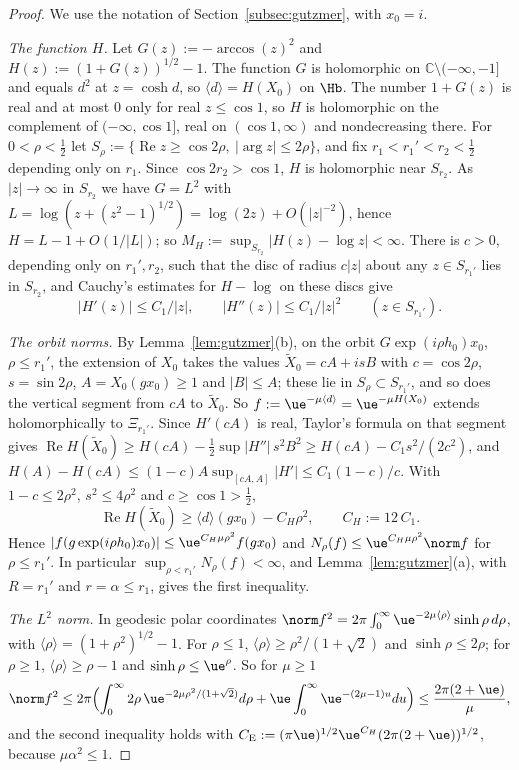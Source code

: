 \begin{proof}
We use the notation of Section~\ref{subsec:gutzmer}, with $x_0=i$.

\emph{The function $H$.} Let $G(z):=-\arccos(z)^2$ and $H(z):=(1+G(z))^{1/2}-1$. The function $G$ is holomorphic on
$\mathbb C\setminus(-\infty,-1]$ and equals $d^2$ at $z=\cosh d$, so $\langle d\rangle=H(X_0)$ on $\Hb$. The number $1+G(z)$ is real and at most $0$ only for
real $z\le\cos1$, so $H$ is holomorphic on the complement of $(-\infty,\cos1]$, real on $(\cos1,\infty)$ and nondecreasing there.
For $0<\rho<\tfrac12$ let $S_\rho:=\{\operatorname{Re}z\ge\cos2\rho,\ |\arg z|\le2\rho\}$, and fix $r_1<r_1'<r_2<\tfrac12$ depending only on $r_1$.
Since $\cos2r_2>\cos1$, $H$ is holomorphic near $S_{r_2}$. As $|z|\to\infty$ in $S_{r_2}$ we have $G=L^2$ with
$L=\log(z+(z^2-1)^{1/2})=\log(2z)+O(|z|^{-2})$, hence $H=L-1+O(1/|L|)$; so $M_H:=\sup_{S_{r_2}}|H(z)-\log z|<\infty$. There is $c>0$,
depending only on $r_1',r_2$, such that the disc of radius $c|z|$ about any $z\in S_{r_1'}$ lies in $S_{r_2}$, and Cauchy's estimates for
$H-\log$ on these discs give
\[
|H'(z)|\le C_1/|z|,\qquad|H''(z)|\le C_1/|z|^2\qquad(z\in S_{r_1'}).
\]

\emph{The orbit norms.} By Lemma~\ref{lem:gutzmer}(b), on the orbit $G\exp(i\rho h_0)x_0$, $\rho\le r_1'$, the extension of $X_0$ takes the
values $\tilde X_0=cA+isB$ with $c=\cos2\rho$, $s=\sin2\rho$, $A=X_0(gx_0)\ge1$ and $|B|\le A$; these lie in $S_\rho\subset S_{r_1'}$, and so does
the vertical segment from $cA$ to $\tilde X_0$. So $f:=\ue^{-\mu\langle d\rangle}=\ue^{-\mu H(X_0)}$ extends holomorphically to $\Xi_{r_1'}$. Since $H'(cA)$ is
real, Taylor's formula on that segment gives $\operatorname{Re}H(\tilde X_0)\ge H(cA)-\tfrac12\sup|H''|\,s^2B^2\ge H(cA)-C_1s^2/(2c^2)$, and
$H(A)-H(cA)\le(1-c)A\sup_{[cA,A]}|H'|\le C_1(1-c)/c$. With $1-c\le2\rho^2$, $s^2\le4\rho^2$ and $c\ge\cos1>\tfrac12$,
\[
\operatorname{Re}H(\tilde X_0)\ge\langle d\rangle(gx_0)-C_H\rho^2,\qquad C_H:=12\,C_1 .
\]
Hence $|f(g\exp(i\rho h_0)x_0)|\le\ue^{C_H\mu\rho^2}f(gx_0)$ and $N_\rho(f)\le\ue^{C_H\mu\rho^2}\norm f$ for $\rho\le r_1'$. In particular
$\sup_{\rho<r_1'}N_\rho(f)<\infty$, and Lemma~\ref{lem:gutzmer}(a), with $R=r_1'$ and $r=\alpha\le r_1$, gives the first inequality.

\emph{The $L^2$ norm.} In geodesic polar coordinates $\norm f^2=2\pi\int_0^\infty\ue^{-2\mu\langle\rho\rangle}\sinh\rho\,d\rho$, with
$\langle\rho\rangle=(1+\rho^2)^{1/2}-1$. For $\rho\le1$, $\langle\rho\rangle\ge\rho^2/(1+\sqrt2)$ and $\sinh\rho\le2\rho$; for $\rho\ge1$,
$\langle\rho\rangle\ge\rho-1$ and $\sinh\rho\le\ue^\rho$. So for $\mu\ge1$
\[
\norm f^2\le2\pi\Bigl(\int_0^\infty2\rho\,\ue^{-2\mu\rho^2/(1+\sqrt2)}d\rho+\ue\int_0^\infty\ue^{-(2\mu-1)u}du\Bigr)\le\frac{2\pi(2+\ue)}{\mu},
\]
and the second inequality holds with $C_{\mathrm E}:=(\pi\ue)^{1/2}\ue^{C_H}(2\pi(2+\ue))^{1/2}$, because $\mu\alpha^2\le1$.
\end{proof}

